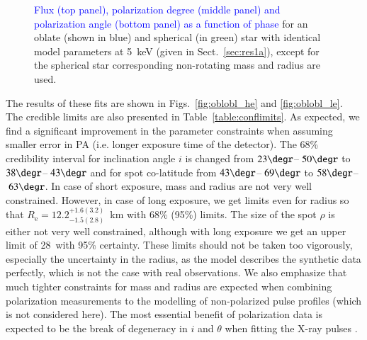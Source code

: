 \documentclass{aa}
\newcommand{\red}[1]{\textcolor{red}{#1}}
\newcommand{\blue}[1]{\textcolor{blue}{#1}}
\newcommand{\req}{R_{\mathrm{e}}}
\newcommand{\msun}{{M}_{\sun}}
\begin{document}
\begin{figure}
\vspace*{-0.4cm}
    \caption{%
    \blue{Flux (top panel), polarization degree (middle panel) and polarization angle (bottom panel) as a function of phase} for an oblate (shown in blue) and spherical (in green) star with identical model parameters at 5~keV (given in Sect.~\ref{sec:res1a}), except for the spherical star corresponding non-rotating mass and radius are used. 
    }
    \label{fig:oblsph_comp}
\end{figure}



The results of these fits are shown in Figs.~\ref{fig:oblobl_he} and \ref{fig:oblobl_le}. The credible limits are also presented in Table~\ref{table:conflimits}.
As expected, we find a significant improvement in the parameter constraints when assuming smaller error in PA (i.e. longer exposure time of the detector). 
The 68\% credibility interval for inclination angle $i$ is changed from $23\degr$--$~50\degr$ to $38\degr$--$~43\degr$ and for spot co-latitude from $43\degr$--$~69\degr$ to $58\degr$--$~63\degr$. 
In case of short exposure, mass and radius are not very well constrained.
However, in case of long exposure, we get limits even for radius so that $\req = 12.2^{+1.6 (3.2)}_{-1.5 (2.8)}$~km  
with 68\%  (95\%) limits. 
The size of the spot $\rho$ is either not very well constrained, although with long exposure we get an upper limit of 28\degr\ with 95\% certainty.
These limits should not be taken too vigorously, especially the uncertainty in the radius, as the model describes the synthetic data perfectly, which is not the case with real observations.
We also emphasize that much tighter constraints for mass and radius are expected when combining polarization measurements to the modelling of non-polarized pulse profiles (which is not considered here).
The most essential benefit of polarization data is expected to be the break of degeneracy in $i$ and $\theta$ when fitting the X-ray pulses \citep{VP04}.

\end{document}
